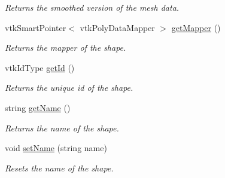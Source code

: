 \begin{DoxyCompactItemize}
\begin{DoxyCompactList}\small\item\em Returns the smoothed version of the mesh data. \end{DoxyCompactList}\item 
\hypertarget{class_shape_a49ac6e4084a14b19c969e576f8068cc5}{}vtk\+Smart\+Pointer$<$ vtk\+Poly\+Data\+Mapper $>$ \hyperlink{class_shape_a49ac6e4084a14b19c969e576f8068cc5}{get\+Mapper} ()\label{class_shape_a49ac6e4084a14b19c969e576f8068cc5}

\begin{DoxyCompactList}\small\item\em Returns the mapper of the shape. \end{DoxyCompactList}\item 
\hypertarget{class_shape_a3bda0a588a5068b0e581650b5bebcd54}{}vtk\+Id\+Type \hyperlink{class_shape_a3bda0a588a5068b0e581650b5bebcd54}{get\+Id} ()\label{class_shape_a3bda0a588a5068b0e581650b5bebcd54}

\begin{DoxyCompactList}\small\item\em Returns the unique id of the shape. \end{DoxyCompactList}\item 
\hypertarget{class_shape_a60a27ae8a862de4b55790a1e979ad266}{}string \hyperlink{class_shape_a60a27ae8a862de4b55790a1e979ad266}{get\+Name} ()\label{class_shape_a60a27ae8a862de4b55790a1e979ad266}

\begin{DoxyCompactList}\small\item\em Returns the name of the shape. \end{DoxyCompactList}\item 
\hypertarget{class_shape_a489da86bf4290d678678621727c1303a}{}void \hyperlink{class_shape_a489da86bf4290d678678621727c1303a}{set\+Name} (string name)\label{class_shape_a489da86bf4290d678678621727c1303a}

\begin{DoxyCompactList}\small\item\em Resets the name of the shape. \end{DoxyCompactList}\end{DoxyCompactItemize}
